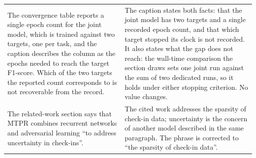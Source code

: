 {\begin{longtable}{@{}p{}p{}@{}}
The convergence table reports a single epoch count for the joint model, which is trained
against two targets, one per task, and the caption describes the column as the epochs
needed to reach the target F1-score. Which of the two targets the reported count
corresponds to is not recoverable from the record. &
The caption states both facts: that the joint model has two targets and a single recorded
epoch count, and that which target stopped its clock is not recorded. It also states what
the gap does not reach: the wall-time comparison the section draws sets one joint run
against the sum of two dedicated runs, so it holds under either stopping criterion. No
value changes. \\
\addlinespace
The related-work section says that MTPR combines recurrent networks and adversarial learning
``to address uncertainty in check-ins''. &
The cited work addresses the sparsity of check-in data; uncertainty is the concern of another
model described in the same paragraph. The phrase is corrected to ``the sparsity of check-in
data''. \\
\end{longtable}
}
